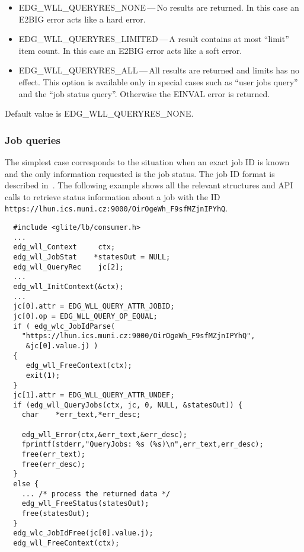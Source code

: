 \begin{itemize}
	\item{EDG\_WLL\_QUERYRES\_NONE}\,---\,No results are returned.
	In this case an E2BIG error acts like a hard error.
	\item{EDG\_WLL\_QUERYRES\_LIMITED}\,---\,A result contains at most ``limit'' item count.
	In this case an E2BIG error acts like a soft error.
	\item{EDG\_WLL\_QUERYRES\_ALL}\,---\,All results are returned and limits has no effect.
	This option is available only in special cases such as ``user jobs query'' and 
	the ``job status query''. Otherwise the EINVAL error is returned.
\end{itemize}
Default value is EDG\_WLL\_QUERYRES\_NONE.


\subsubsection{Job queries}

\label{JS}

The simplest case corresponds to the situation when an exact job ID
is known and the only information requested is the job status. The job ID
format is described in~\cite{lbapi}.
The following example shows 
all the relevant structures and API calls to retrieve status information
about a job with the ID\\
\texttt{https://lhun.ics.muni.cz:9000/OirOgeWh\_F9sfMZjnIPYhQ}.

\begin{verbatim}
  #include <glite/lb/consumer.h>
  ...
  edg_wll_Context     ctx;    
  edg_wll_JobStat    *statesOut = NULL;
  edg_wll_QueryRec    jc[2];
  ...
  edg_wll_InitContext(&ctx);
  ...
  jc[0].attr = EDG_WLL_QUERY_ATTR_JOBID;
  jc[0].op = EDG_WLL_QUERY_OP_EQUAL;
  if ( edg_wlc_JobIdParse(
    "https://lhun.ics.muni.cz:9000/OirOgeWh_F9sfMZjnIPYhQ",
     &jc[0].value.j) )
  {
     edg_wll_FreeContext(ctx);
     exit(1);
  }
  jc[1].attr = EDG_WLL_QUERY_ATTR_UNDEF;
  if (edg_wll_QueryJobs(ctx, jc, 0, NULL, &statesOut)) {
    char    *err_text,*err_desc;

    edg_wll_Error(ctx,&err_text,&err_desc);
    fprintf(stderr,"QueryJobs: %s (%s)\n",err_text,err_desc);
    free(err_text);
    free(err_desc);
  }
  else {
    ...	/* process the returned data */
    edg_wll_FreeStatus(statesOut);
    free(statesOut);
  }
  edg_wlc_JobIdFree(jc[0].value.j);
  edg_wll_FreeContext(ctx);
\end{verbatim}

